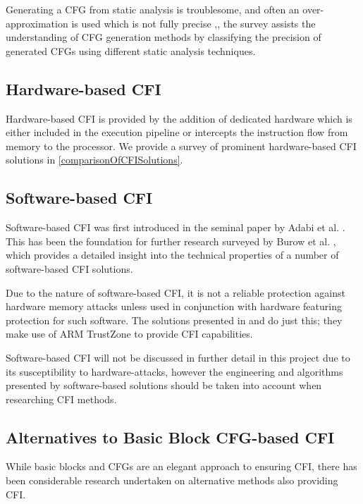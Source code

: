 Generating a CFG from static analysis is troublesome, and often an over-approximation is used which is not fully precise \cite{Carlini2015},\cite{Kinder2012}, the survey \cite{Burow} assists the understanding of CFG generation methods by classifying the precision of generated CFGs using different static analysis techniques.

\subsection{Hardware-based CFI}

Hardware-based CFI is provided by the addition of dedicated hardware which is either included in the execution pipeline or intercepts the instruction flow from memory to the processor. We provide a survey of prominent hardware-based CFI solutions in \ref{comparisonOfCFISolutions}.

\subsection{Software-based CFI}

Software-based CFI was first introduced in the seminal paper by Adabi et al. \cite{Abadi2005}. This has been the foundation for further research surveyed by Burow et al. \cite{Burow}, which provides a detailed insight into the technical properties of a number of software-based CFI solutions.

Due to the nature of software-based CFI, it is not a reliable protection against hardware memory attacks unless used in conjunction with hardware featuring protection for such software. The solutions presented in \cite{Abera2016} and \cite{Nyman2017a} do just this; they make use of ARM TrustZone to provide CFI capabilities.

Software-based CFI will not be discussed in further detail in this project due to its susceptibility to hardware-attacks, however the engineering and algorithms presented by software-based solutions should be taken into account when researching CFI methods.

\subsection{Alternatives to Basic Block CFG-based CFI}

While basic blocks and CFGs are an elegant approach to ensuring CFI, there has been considerable research undertaken on alternative methods also providing CFI.

